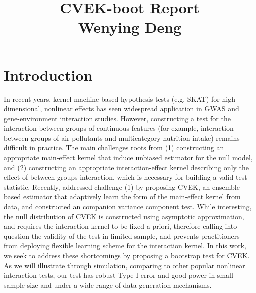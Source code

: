 \documentclass[11pt]{article}
\begin{document}
\setlength{\parindent}{0pt}

\title{CVEK-boot Report\\Wenying Deng \vspace{-1ex}}

\pretitle{\begin{flushright}\normalsize}
\posttitle{\par\end{flushright}}
\author{}
\date{}
\vspace{-10em}
\maketitle
\vspace{6em}


\tableofcontents
\clearpage
\vspace{2em}
\section{{\bf Introduction}}
In recent years, kernel machine-based hypothesis tests (e.g. SKAT) for high-dimensional, nonlinear effects has seen widespread application in GWAS and gene-environment interaction studies. However, constructing a test for the interaction between groups of continuous features (for example, interaction between groups of air pollutants and multicategory nutrition intake) remains difficult in practice. The main challenges roots from (1) constructing an appropriate main-effect kernel that induce unbiased estimator for the null model, and (2) constructing an appropriate interaction-effect kernel describing only the effect of between-groups interaction, which is necessary for building a valid test statistic. Recently, \citep{liu_robust_2017} addressed challenge (1) by proposing CVEK, an ensemble-based estimator that adaptively learn the form of the main-effect kernel from data, and constructed an companion variance component test. While interesting, the null distribution of CVEK is constructed using asymptotic approximation, and requires the interaction-kernel to be fixed a priori, therefore calling into question the validity of the test in limited sample, and prevents practitioners from deploying flexible learning scheme for the interaction kernel. In this work, we seek to address these shortcomings by proposing a bootstrap test for CVEK. As we will illustrate through simulation, comparing to other popular nonlinear interaction tests, our test has robust Type I error and good power in small sample size and under a wide range of data-generation mechanisms.
\end{document}
